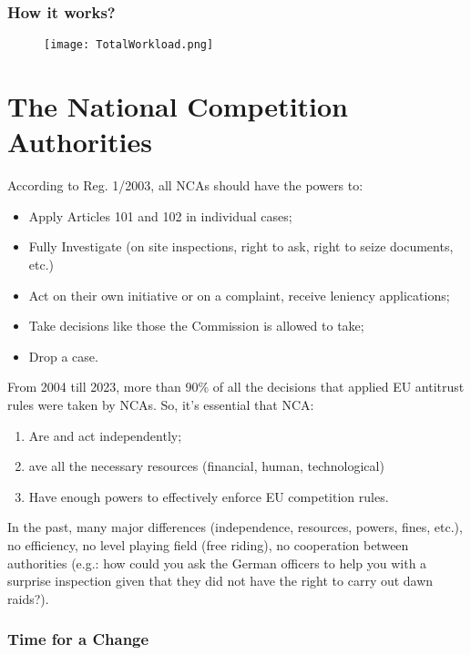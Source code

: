         \subsubsection{How it works?}

        \begin{figure}[h]
            \centering
            \texttt{[image: TotalWorkload.png]}
        \end{figure}

\section{The National Competition Authorities}

    According to Reg. 1/2003, all NCAs should have the powers to:
    \begin{itemize}
        \item Apply Articles 101 and 102 in individual cases;
        \item Fully Investigate (on site inspections, right to ask, right to seize documents, etc.)
        \item Act on their own initiative or on a complaint, receive leniency applications;
        \item Take decisions like those the Commission is allowed to take;
        \item Drop a case.
    \end{itemize}
    
    From 2004 till 2023, more than 90\% of all the decisions that applied EU antitrust rules were taken by NCAs. So, it's essential that NCA:
    \begin{enumerate}
        \item Are and act independently;
        \item ave all the necessary resources (financial, human, technological)
        \item Have enough powers to effectively enforce EU competition rules.
    \end{enumerate}
    In the past, many major differences (independence, resources, powers, fines, etc.), no efficiency, no level playing field (free riding), no cooperation between authorities (e.g.: how could you ask the German officers to help you with a surprise inspection given that they did not have the right to carry out dawn raids?). 

        \subsubsection{Time for a Change}

